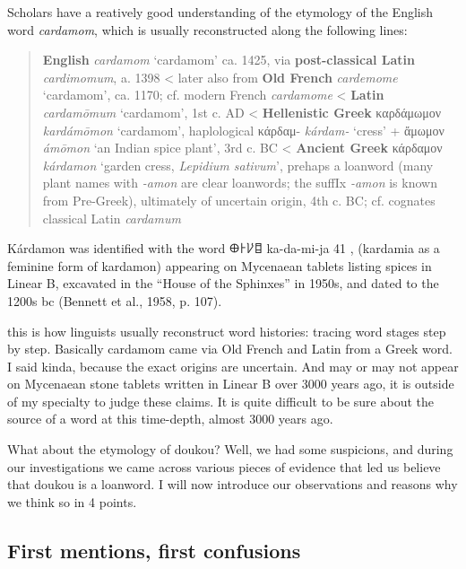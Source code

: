 \documentclass[12pt]{article}
\begin{document}
Scholars have a reatively good understanding of the etymology of the English word \textit{cardamom}, which is usually reconstructed along the following lines:

\begin{quote}
    \textbf{English} \textit{cardamom} `cardamom' ca. 1425, via \textbf{post-classical Latin} \textit{cardimomum}, a. 1398
    < later also from \textbf{Old French} \textit{cardemome} `cardamom', ca. 1170; cf. modern French \textit{cardamome}
    < \textbf{Latin} \textit{cardamōmum} `cardamom', 1st c. AD
    < \textbf{Hellenistic Greek} {καρδάμωμον} \textit{kardámōmon} `cardamom', haplological κάρδαμ- \textit{kárdam-} `cress' + ἄμωμον \textit{ámōmon} `an Indian spice plant', 3rd c. BC
    < \textbf{Ancient Greek} {κάρδαμον} \textit{kárdamon} `garden cress, \textit{Lepidium sativum}', prehaps a loanword (many plant names with \textit{-amon} are clear loanwords; the suffIx \textit{-amon} is known from Pre-Greek), ultimately of uncertain origin, 4th c. BC; cf. cognates classical Latin \textit{cardamum}
    \parencites[s.v. cardamom]{oed}[s.v. cardamome]{tlfi}[s.v. cardamomum]{lewis_1879_latin}[s.v. καρδάμωμον]{liddell_1940_greekenglish}[s.v. κάρδαμον]{liddell_1940_greekenglish}[644]{beekes_2010_etymological}
\end{quote}

Kárdamon was identified with the word 𐀏𐀅𐀖𐀊 ka-da-mi-ja 41 , (kardamia as a feminine form of kardamon) appearing on Mycenaean tablets listing spices in Linear B, excavated in the “House of the Sphinxes” in 1950s, and dated to the 1200s bc (Bennett et al., 1958, p. 107).



this is how linguists usually reconstruct word histories: tracing word stages step by step. Basically cardamom came via Old French and Latin from a Greek word. I said kinda, because the exact origins are uncertain. And may or may not appear on Mycenaean stone tablets written in Linear B over 3000 years ago, it is outside of my specialty to judge these claims. It is quite difficult to be sure about the source of a word at this time-depth, almost 3000 years ago.

What about the etymology of doukou? Well, we had some suspicions, and during our investigations we came across various pieces of evidence that led us believe that doukou is a loanword. I will now introduce our observations and reasons why we think so in 4 points.

\subsection{First mentions, first confusions}
\end{document}
